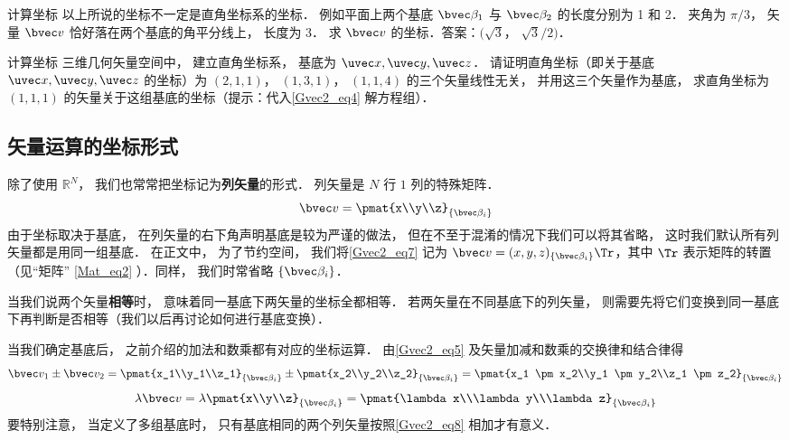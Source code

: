 \begin{exercise}{计算坐标}
以上所说的坐标不一定是直角坐标系的坐标． 例如平面上两个基底 $\bvec \beta_1$ 与 $\bvec \beta_2$ 的长度分别为 1 和 2． 夹角为 $\pi/3$， 矢量 $\bvec v$ 恰好落在两个基底的角平分线上， 长度为 3． 求 $\bvec v$ 的坐标．答案：$(\sqrt 3$， $\sqrt 3/2)$．
\end{exercise}

\begin{exercise}{计算坐标}
三维几何矢量空间中， 建立直角坐标系， 基底为 $\uvec x, \uvec y, \uvec z$． 请证明直角坐标（即关于基底 $\uvec x, \uvec y, \uvec z$ 的坐标）为 $(2, 1, 1)$， $(1, 3, 1)$， $(1, 1, 4)$ 的三个矢量线性无关， 并用这三个矢量作为基底， 求直角坐标为 $(1, 1, 1)$ 的矢量关于这组基底的坐标（提示：代入\autoref{Gvec2_eq4} 解方程组）．
\end{exercise}

\subsection{矢量运算的坐标形式}
除了使用 $\mathbb R^N$， 我们也常常把坐标记为\textbf{列矢量}的形式． 列矢量是 $N$ 行 $1$ 列的特殊矩阵．
\begin{equation}\label{Gvec2_eq7}
\bvec v = \pmat{x\\y\\z}_{\{\bvec\beta_i\}}
\end{equation}
由于坐标取决于基底， 在列矢量的右下角声明基底是较为严谨的做法， 但在不至于混淆的情况下我们可以将其省略， 这时我们默认所有列矢量都是用同一组基底． 在正文中， 为了节约空间， 我们将\autoref{Gvec2_eq7} 记为 $\bvec v = (x, y, z)_{\{\bvec\beta_i\}}\Tr$，其中 $\Tr$ 表示矩阵的转置（见“矩阵” \autoref{Mat_eq2} ）．同样， 我们时常省略 $\{\bvec\beta_i\}$．

当我们说两个矢量\textbf{相等}时， 意味着同一基底下两矢量的坐标全都相等． 若两矢量在不同基底下的列矢量， 则需要先将它们变换到同一基底下再判断是否相等（我们以后再讨论如何进行基底变换）．

当我们确定基底后， 之前介绍的加法和数乘都有对应的坐标运算． 由\autoref{Gvec2_eq5} 及矢量加减和数乘的交换律和结合律得
\begin{equation}\label{Gvec2_eq8}
\bvec v_1 \pm \bvec v_2 = \pmat{x_1\\y_1\\z_1}_{\{\bvec\beta_i\}} \pm \pmat{x_2\\y_2\\z_2}_{\{\bvec\beta_i\}} = \pmat{x_1 \pm x_2\\y_1 \pm y_2\\z_1 \pm z_2}_{\{\bvec\beta_i\}}
\end{equation}
\begin{equation}\label{Gvec2_eq9}
\lambda \bvec v = \lambda\pmat{x\\y\\z}_{\{\bvec\beta_i\}} = \pmat{\lambda x\\\lambda y\\\lambda z}_{\{\bvec\beta_i\}}
\end{equation}
要特别注意， 当定义了多组基底时， 只有基底相同的两个列矢量按照\autoref{Gvec2_eq8} 相加才有意义．
